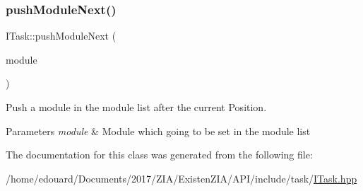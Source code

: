 \subsubsection{\texorpdfstring{push\+Module\+Next()}{pushModuleNext()}}
{\footnotesize\ttfamily I\+Task\+::push\+Module\+Next (\begin{DoxyParamCaption}\item[{std\+::unique\+\_\+ptr$<$ \mbox{\hyperlink{classxzia_1_1AHTTPModule}{A\+H\+T\+T\+P\+Module}} $>$}]{module }\end{DoxyParamCaption})\hspace{0.3cm}{\ttfamily [pure virtual]}}



Push a module in the module list after the current Position. 


\begin{DoxyParams}{Parameters}
{\em module} & Module which going to be set in the module list \\
\hline
\end{DoxyParams}


The documentation for this class was generated from the following file\+:\begin{DoxyCompactItemize}
\item 
/home/edouard/\+Documents/2017/\+Z\+I\+A/\+Existen\+Z\+I\+A/\+A\+P\+I/include/task/\mbox{\hyperlink{ITask_8hpp}{I\+Task.\+hpp}}\end{DoxyCompactItemize}
